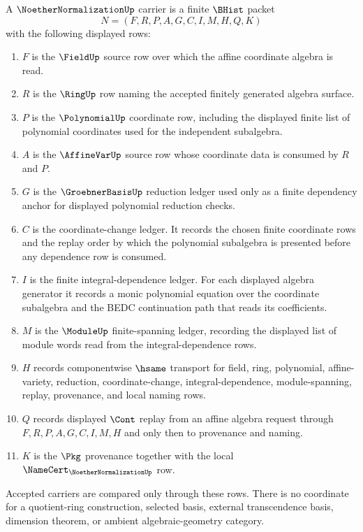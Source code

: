 \begin{definition}
\label{def:noether-normalization-carrier}
A $\NoetherNormalizationUp$ carrier is a finite $\BHist$ packet
$$
N=(F,R,P,A,G,C,I,M,H,Q,K)
$$
with the following displayed rows:
\begin{enumerate}
\item $F$ is the $\FieldUp$ source row over which the affine coordinate algebra is read.
\item $R$ is the $\RingUp$ row naming the accepted finitely generated algebra surface.
\item $P$ is the $\PolynomialUp$ coordinate row, including the displayed finite list of polynomial coordinates used for the independent subalgebra.
\item $A$ is the $\AffineVarUp$ source row whose coordinate data is consumed by $R$ and $P$.
\item $G$ is the $\GroebnerBasisUp$ reduction ledger used only as a finite dependency anchor for displayed polynomial reduction checks.
\item $C$ is the coordinate-change ledger. It records the chosen finite coordinate rows and the replay order by which the polynomial subalgebra is presented before any dependence row is consumed.
\item $I$ is the finite integral-dependence ledger. For each displayed algebra generator it records a monic polynomial equation over the coordinate subalgebra and the BEDC continuation path that reads its coefficients.
\item $M$ is the $\ModuleUp$ finite-spanning ledger, recording the displayed list of module words read from the integral-dependence rows.
\item $H$ records componentwise $\hsame$ transport for field, ring, polynomial, affine-variety, reduction, coordinate-change, integral-dependence, module-spanning, replay, provenance, and local naming rows.
\item $Q$ records displayed $\Cont$ replay from an affine algebra request through $F,R,P,A,G,C,I,M,H$ and only then to provenance and naming.
\item $K$ is the $\Pkg$ provenance together with the local $\NameCert_{\NoetherNormalizationUp}$ row.
\end{enumerate}
Accepted carriers are compared only through these rows. There is no coordinate for a quotient-ring construction, selected basis, external transcendence basis, dimension theorem, or ambient algebraic-geometry category.
\end{definition}

